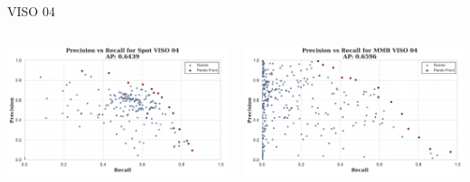 \begin{frame}{VISO 04}
    \begin{columns}
        \begin{column}{0.5\textwidth}
            \centering
            \includegraphics[width=\textwidth,keepaspectratio]{images/bom/precision_recall_Spot_VISO_04.png}
        \end{column}
        \begin{column}{0.5\textwidth}
            \centering
            \includegraphics[width=\textwidth,keepaspectratio]{images/bom/precision_recall_MMB_VISO_04.png}
        \end{column}
    \end{columns}
\end{frame}

